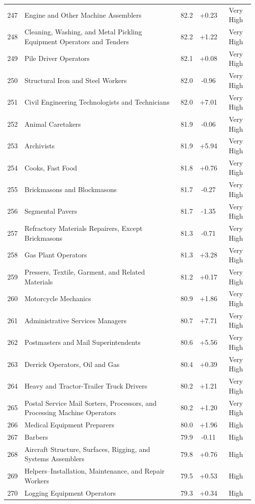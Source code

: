 {\begin{longtable}{rp{7cm}ccc}
247 & Engine and Other Machine Assemblers & 82.2 & +0.23 & Very High \\
248 & Cleaning, Washing, and Metal Pickling Equipment Operators and Tenders & 82.2 & +1.22 & Very High \\
249 & Pile Driver Operators & 82.1 & +0.08 & Very High \\
250 & Structural Iron and Steel Workers & 82.0 & -0.96 & Very High \\
251 & Civil Engineering Technologists and Technicians & 82.0 & +7.01 & Very High \\
252 & Animal Caretakers & 81.9 & -0.06 & Very High \\
253 & Archivists & 81.9 & +5.94 & Very High \\
254 & Cooks, Fast Food & 81.8 & +0.76 & Very High \\
255 & Brickmasons and Blockmasons & 81.7 & -0.27 & Very High \\
256 & Segmental Pavers & 81.7 & -1.35 & Very High \\
257 & Refractory Materials Repairers, Except Brickmasons & 81.3 & -0.71 & Very High \\
258 & Gas Plant Operators & 81.3 & +3.28 & Very High \\
259 & Pressers, Textile, Garment, and Related Materials & 81.2 & +0.17 & Very High \\
260 & Motorcycle Mechanics & 80.9 & +1.86 & Very High \\
261 & Administrative Services Managers & 80.7 & +7.71 & Very High \\
262 & Postmasters and Mail Superintendents & 80.6 & +5.56 & Very High \\
263 & Derrick Operators, Oil and Gas & 80.4 & +0.39 & Very High \\
264 & Heavy and Tractor-Trailer Truck Drivers & 80.2 & +1.21 & Very High \\
265 & Postal Service Mail Sorters, Processors, and Processing Machine Operators & 80.2 & +1.20 & Very High \\
266 & Medical Equipment Preparers & 80.0 & +1.96 & High \\
267 & Barbers & 79.9 & -0.11 & High \\
268 & Aircraft Structure, Surfaces, Rigging, and Systems Assemblers & 79.8 & +0.76 & High \\
269 & Helpers--Installation, Maintenance, and Repair Workers & 79.5 & +0.53 & High \\
270 & Logging Equipment Operators & 79.3 & +0.34 & High \\

\end{longtable}}
